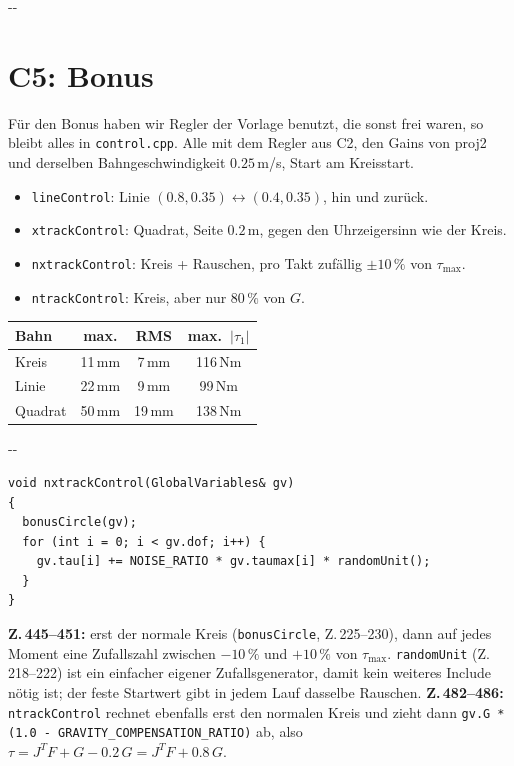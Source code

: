 \documentclass[10pt,a4paper]{article}
\makeatletter
\newcommand{\secneed}[1]{\par\penalty\@M\begingroup\setlength{\dimen@}{#1}\dimen@ii\pagegoal
  \advance\dimen@ii-\pagetotal\ifdim\dimen@>\dimen@ii\ifdim\dimen@ii>\z@\vfil\fi\penalty-\@M\fi\endgroup}
\let\oldsection\section
\renewcommand{\section}{\secneed{9\baselineskip}\oldsection}
\newcommand{\code}[1]{\texttt{#1}}
\makeatother
\begin{document}
\section{C5: Bonus}

Für den Bonus haben wir Regler der Vorlage benutzt, die sonst frei waren, so bleibt alles in \code{control.cpp}. Alle mit
dem Regler aus C2, den Gains von proj2 und derselben Bahngeschwindigkeit $0.25$\,m/s, Start am Kreisstart.

\begin{minipage}[c]{0.5\textwidth}
\begin{itemize}
  \item \code{lineControl}: Linie $(0.8, 0.35) \leftrightarrow (0.4, 0.35)$, hin und zurück.
  \item \code{xtrackControl}: Quadrat, Seite $0.2$\,m, gegen den Uhrzeigersinn wie der Kreis.
  \item \code{nxtrackControl}: Kreis + Rauschen, pro Takt zufällig $\pm 10\,\%$ von $\tau_{\max}$.
  \item \code{ntrackControl}: Kreis, aber nur $80\,\%$ von $G$.
\end{itemize}
\end{minipage}\hfill
\begin{minipage}[c]{0.47\textwidth}
\centering
{\small
\begin{tabular}{lccc}
  \toprule
  Bahn & max. & RMS & max.\ $|\tau_1|$ \\
  \midrule
  Kreis & 11\,mm & 7\,mm & 116\,Nm \\
  Linie & 22\,mm & 9\,mm & 99\,Nm \\
  Quadrat & 50\,mm & 19\,mm & 138\,Nm \\
  \bottomrule
\end{tabular}
}
\end{minipage}

\secneed{8\baselineskip}
\begin{lstlisting}[firstnumber=445]
void nxtrackControl(GlobalVariables& gv)
{
  bonusCircle(gv);
  for (int i = 0; i < gv.dof; i++) {
    gv.tau[i] += NOISE_RATIO * gv.taumax[i] * randomUnit();
  }
}
\end{lstlisting}
\textbf{Z.\,445--451:} erst der normale Kreis (\code{bonusCircle}, Z.\,225--230), dann auf jedes Moment eine Zufallszahl
zwischen $-10\,\%$ und $+10\,\%$ von $\tau_{\max}$. \code{randomUnit} (Z.\,218--222) ist ein einfacher eigener
Zufallsgenerator, damit kein weiteres Include nötig ist; der feste Startwert gibt in jedem Lauf dasselbe Rauschen.
\textbf{Z.\,482--486:} \code{ntrackControl} rechnet ebenfalls erst den normalen Kreis und zieht dann
\code{gv.G * (1.0 - GRAVITY\_COMPENSATION\_RATIO)} ab, also $\tau = J^T F + G - 0.2\,G = J^T F + 0.8\,G$.
\end{document}
